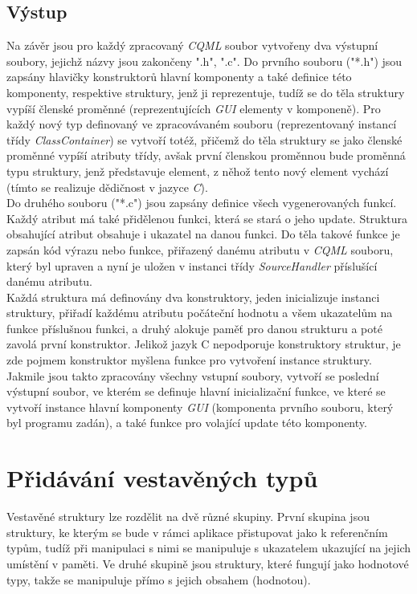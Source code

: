 \documentclass[11pt,twoside,a4paper]{book}
\begin{document}
{{\begin{ttemize}
{{\begin{lastlisting}[frame=single,caption=Řešení v pseudokódu problematického použití operátoru "." v přiřazovacím výroku,label=lst:var0N]
\subsection{Výstup}
Na závěr jsou pro každý zpracovaný \textit{CQML} soubor vytvořeny dva výstupní soubory, jejichž názvy jsou zakončeny ".h", ".c". 
Do prvního souboru ("*.h") jsou zapsány hlavičky konstruktorů hlavní komponenty a také definice této komponenty, respektive struktury, jenž ji reprezentuje, tudíž se do těla struktury vypíší členské proměnné (reprezentujících \textit{GUI} elementy v komponeně). Pro každý nový typ definovaný ve zpracovávaném souboru (reprezentovaný instancí třídy \textit{ClassContainer}) se vytvoří totéž, přičemž do těla struktury se jako členské proměnné vypíší atributy třídy, avšak první členskou proměnnou bude proměnná typu struktury, jenž představuje element, z něhož tento nový element vychází (tímto se realizuje dědičnost v jazyce \textit{C}).\\
Do druhého souboru ("*.c") jsou zapsány definice všech vygenerovaných funkcí. Každý atribut má také přidělenou funkci, která se stará o jeho update. Struktura obsahující atribut obsahuje i ukazatel na danou funkci. Do těla takové funkce je zapsán kód výrazu nebo funkce, přiřazený danému atributu v \textit{CQML} souboru, který byl upraven a nyní je uložen v instanci třídy \textit{SourceHandler} příslušící danému atributu.\\
Každá struktura má definovány dva konstruktory, jeden inicializuje instanci struktury, přiřadí každému atributu počáteční hodnotu a všem ukazatelům na funkce příslušnou funkci, a druhý alokuje paměť pro danou strukturu a poté zavolá první konstruktor. Jelikož jazyk C nepodporuje konstruktory struktur, je zde pojmem konstruktor myšlena funkce pro vytvoření instance struktury.\\
Jakmile jsou takto zpracovány všechny vstupní soubory, vytvoří se poslední výstupní soubor, ve kterém se definuje hlavní inicializační funkce, ve které se vytvoří instance hlavní komponenty \textit{GUI} (komponenta prvního souboru, který byl programu zadán), a také funkce pro volající update této komponenty.\\

\section{\label{SEC:macI}Přidávání vestavěných typů}
Vestavěné struktury lze rozdělit na dvě různé skupiny. První skupina jsou struktury, ke kterým se bude v rámci aplikace přistupovat jako k referenčním typům, tudíž při manipulaci s nimi se manipuluje s ukazatelem ukazující na jejich umístění v paměti. Ve druhé skupině jsou struktury, které fungují jako hodnotové typy, takže se manipuluje přímo s jejich obsahem (hodnotou).\\


\end{lastlisting}}}
\end{ttemize}}}
\end{document}
